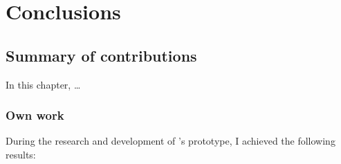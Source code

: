 \chapter{Conclusions}
\label{chap:conclusions}

\section{Summary of contributions}

In this chapter, \ldots

\subsection{Own work}

During the research and development of \iqd{}'s prototype, I achieved the following results:

